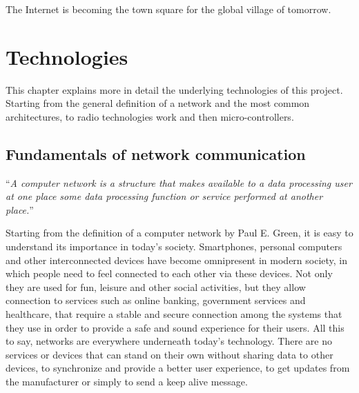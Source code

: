 
\begin{savequote}[70mm]
	The Internet is becoming the town square for the global village of tomorrow.
\end{savequote}


\chapter{Technologies}\label{chapter:technologies}
	
	This chapter explains more in detail the underlying technologies of this project.
	Starting from the general definition of a network and the most common architectures, to radio technologies work and then micro-controllers.
		
	\section{Fundamentals of network communication}
		
		\begin{center}
			\begin{minipage}[H]{0.9\columnwidth}
				\begin{center}
					``\textit{A computer network is a structure that makes available to a data processing user at one place some data processing function or service performed at another place.}''~\cite{nla.cat-vn252493}
				\end{center}
			\end{minipage}
		\end{center}
	
		Starting from the definition of a computer network by Paul E. Green, it is easy to understand its importance in today's society.
		Smartphones, personal computers and other interconnected devices have become omnipresent in modern society, in which people need to feel connected to each other via these devices.
		Not only they are used for fun, leisure and other social activities, but they allow connection to services such as online banking, government services and healthcare, that require a stable and secure connection among the systems that they use in order to provide a safe and sound experience for their users.
		All this to say, networks are everywhere underneath today's technology.
		There are no services or devices that can stand on their own without sharing data to other devices, to synchronize and provide a better user experience, to get updates from the manufacturer or simply to send a keep alive message.
		
